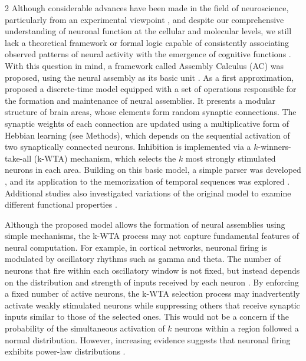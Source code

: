 \documentclass[a4paper, 10pt]{article}
\begin{document}
\begin{multicols}{2}
Although considerable advances have been made in the field of neuroscience, particularly from an experimental viewpoint \cite{Yuste2015-calcium,Buzsaki_mtds,twophoton_1990-vx}, and despite our comprehensive understanding of neuronal function at the cellular and molecular levels, we still lack a theoretical framework or formal logic capable of consistently associating observed patterns of neural activity with the emergence of cognitive functions \cite{neuronqa}. With this question in mind, a framework called Assembly Calculus (AC) was proposed, using the neural assembly as its basic unit \cite{christos,random,longterm}. As a first approximation, \cite{christos} proposed a  discrete-time model equipped with a set of operations responsible for the formation and maintenance of neural assemblies. It presents a modular structure of brain areas, whose elements form random synaptic connections. The synaptic weights of each connection are updated using a multiplicative form of Hebbian learning (see Methods), which depends on the sequential activation of two synaptically connected neurons. Inhibition is implemented via a $k$-winners-take-all (k-WTA)  mechanism, which selects the $k$ most strongly stimulated neurons in each area. Building on this basic model, a simple parser was developed \cite{daniel}, and its application to the memorization of temporal sequences was explored \cite{Dabagia_2024}. Additional studies also investigated variations of the original model to examine different functional properties \cite{Constantinides_2021, rec}.

Although the proposed model allows the formation of neural assemblies using simple mechanisms, the k-WTA process may not capture fundamental features of neural computation. For example, in cortical networks, neuronal firing is modulated by oscillatory rhythms such as gamma and theta. The number of neurons that fire within each oscillatory window is not fixed, but instead depends on the distribution and strength of inputs received by each neuron \cite{licurgo}.  By enforcing a fixed number of active neurons, the k-WTA selection process may inadvertently activate weakly stimulated neurons while suppressing others that receive synaptic inputs similar to those of the selected ones. This would not be a concern if the probability of the simultaneous activation of $k$ neurons within a region followed a normal distribution. However, increasing evidence suggests that neuronal firing exhibits power-law distributions \cite{Bialek2015, Bialek2025-kn}.



\end{multicols}
\end{document}
